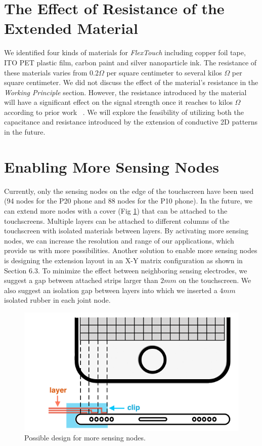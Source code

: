 \section{The Effect of Resistance of the Extended Material}
We identified four kinds of materials for \textit{FlexTouch} including copper foil tape, ITO PET plastic film, carbon paint and silver nanoparticle ink. The resistance of these materials varies from $0.2 \Omega$ per square centimeter to several kilos $\Omega$ per square centimeter. We did not discuss the effect of the material's resistance in the \textit{Working Principle} section. However, the resistance introduced by the material will have a significant effect on the signal strength once it reaches to kilos $\Omega$ according to prior work ~\cite{mobicom-gao18}. We will explore the feasibility of utilizing both the capacitance and resistance introduced by the extension of conductive 2D patterns in the future. 

\section{Enabling More Sensing Nodes}
Currently, only the sensing nodes on the edge of the touchscreen have been used (94 nodes for the P20 phone and 88 nodes for the P10 phone). In the future, we can extend more nodes with a cover (Fig \ref{fig:3d layout}) that can be attached to the touchscreens. Multiple layers can be attached to different columns of the touchscreen with isolated materials between layers. By activating more sensing nodes, we can increase the resolution and range of our applications, which provide us with more possibilities. Another solution to enable more sensing nodes is designing the extension layout in an X-Y matrix configuration as shown in Section $6.3$. To minimize the effect between neighboring sensing electrodes, we suggest a gap between attached strips larger than $2 mm$ on the touchscreen. We also suggest an isolation gap between layers into which we inserted a $4mm$ isolated rubber in each joint node. 

\begin{figure}[ht]
\centering
  \includegraphics[width=0.25\columnwidth]{figures/3d_layout.png}
  \setlength{\belowcaptionskip}{-6pt}
  \caption{Possible design for more sensing nodes. }
  \label{fig:3d layout}
\end{figure}

